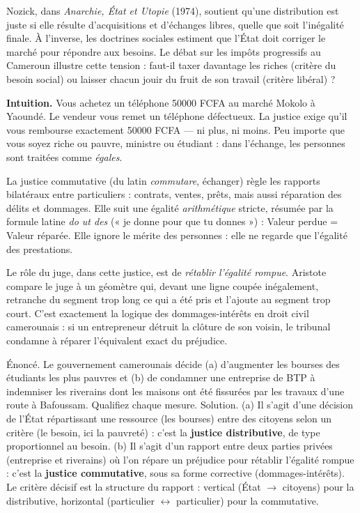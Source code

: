 \documentclass[11pt]{article}
\newcommand{\cle}[1]{{\popxbold\color{popdark}#1}}
\newcounter{popsec}
\newcounter{popsub}
\newcommand{\courssub}[1]{%
  \stepcounter{popsub}%
  \par\vspace{9pt}\noindent{\popxbold\fontsize{11.5}{13}\selectfont\color{popink}{\color{poporange}\thepopsec.\thepopsub}\hspace{6pt}#1}\par\nopagebreak\vspace{4pt}
}
\begin{document}
Nozick, dans \emph{Anarchie, État et Utopie} (1974), soutient qu'une distribution est juste si elle résulte d'acquisitions et d'échanges libres, quelle que soit l'inégalité finale. À l'inverse, les doctrines sociales estiment que l'État doit corriger le marché pour répondre aux besoins. Le débat sur les impôts progressifs au Cameroun illustre cette tension : faut-il taxer davantage les riches (critère du besoin social) ou laisser chacun jouir du fruit de son travail (critère libéral) ?

\courssub{La justice commutative : l'égalité arithmétique}

\textbf{Intuition.} Vous achetez un téléphone \SI{50000}{} FCFA au marché Mokolo à Yaoundé. Le vendeur vous remet un téléphone défectueux. La justice exige qu'il vous rembourse exactement \SI{50000}{} FCFA — ni plus, ni moins. Peu importe que vous soyez riche ou pauvre, ministre ou étudiant : dans l'échange, les personnes sont traitées comme \emph{égales}.

\begin{definition}
La \cle{justice commutative} (du latin \emph{commutare}, échanger) règle les rapports bilatéraux entre particuliers : contrats, ventes, prêts, mais aussi réparation des délits et dommages. Elle suit une égalité \emph{arithmétique} stricte, résumée par la formule latine \emph{do ut des} (« je donne pour que tu donnes ») : Valeur perdue = Valeur réparée. Elle ignore le mérite des personnes : elle ne regarde que l'égalité des prestations.
\end{definition}

Le rôle du juge, dans cette justice, est de \emph{rétablir l'égalité rompue}. Aristote compare le juge à un géomètre qui, devant une ligne coupée inégalement, retranche du segment trop long ce qui a été pris et l'ajoute au segment trop court. C'est exactement la logique des \cle{dommages-intérêts} en droit civil camerounais : si un entrepreneur détruit la clôture de son voisin, le tribunal condamne à réparer l'équivalent exact du préjudice.

\begin{exoresolu}
Énoncé. Le gouvernement camerounais décide (a) d'augmenter les bourses des étudiants les plus pauvres et (b) de condamner une entreprise de BTP à indemniser les riverains dont les maisons ont été fissurées par les travaux d'une route à Bafoussam. Qualifiez chaque mesure.
\tcblower
Solution. (a) Il s'agit d'une décision de l'État répartissant une ressource (les bourses) entre des citoyens selon un critère (le besoin, ici la pauvreté) : c'est la \textbf{justice distributive}, de type proportionnel au besoin. (b) Il s'agit d'un rapport entre deux parties privées (entreprise et riverains) où l'on répare un préjudice pour rétablir l'égalité rompue : c'est la \textbf{justice commutative}, sous sa forme corrective (dommages-intérêts). Le critère décisif est la structure du rapport : vertical (État $\to$ citoyens) pour la distributive, horizontal (particulier $\leftrightarrow$ particulier) pour la commutative.
\end{exoresolu}
\end{document}
